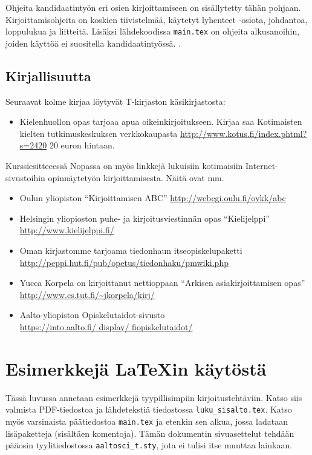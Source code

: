 Ohjeita kandidaatintyön eri osien kirjoittamiseen on sisällytetty
tähän pohjaan. Kirjoittamisohjeita on koskien tiivistelmää, käytetyt
lyhenteet -osiota, johdantoa, loppulukua ja liitteitä.  Lisäksi
lähdekoodissa \verb!main.tex! on ohjeita alkusanoihin, joiden käyttöä
ei suositella kandidaatintyössä.
.


\subsection{Kirjallisuutta}

Seuraavat kolme kirjaa löytyvät T-kirjaston käsikirjastosta:
%
\begin{itemize}


\item Kielenhuollon opas tarjoaa apua
  oikeinkirjoitukseen. Kirjaa saa Kotimaisten kielten
  tutkimuskeskuksen verkkokaupasta
  \url{http://www.kotus.fi/index.phtml?s=2420} 20 euron hintaan.
\end{itemize}

Kurssiesitteeessä Nopassa on myös linkkejä lukuisiin 
kotimaisiin Internet-sivustoihin opinnäytetyön kirjoittamisesta.
Näitä ovat mm.
%
\begin{itemize}
\item Oulun yliopiston ``Kirjoittamisen ABC''
  \url{http://webcgi.oulu.fi/oykk/abc}
%
\item Helsingin yliopioston puhe- ja kirjoitusviestinnän opas
  ``Kielijelppi'' \url{http://www.kielijelppi.fi/}
%
\item Oman kirjastomme tarjoama tiedonhaun itseopiskelupaketti
  \url{http://peppi.hut.fi/pub/opetus/tiedonhaku/pmwiki.php}
%
\item Yucca Korpela on kirjoittanut nettioppaan ``Arkisen
  asiakirjoittamisen opas'' \url{http://www.cs.tut.fi/~jkorpela/kirj/}
\item Aalto-yliopiston Opiskelutaidot-sivusto \\
  \url{https://into.aalto.fi/ display/ fiopiskelutaidot/}
%
\end{itemize}



\section{Esimerkkejä \LaTeX{}in käytöstä}
\label{sec:esimluku}

Tässä luvussa annetaan esimerkkejä tyypillisimpiin
kirjoitustehtäviin. Katso siis valmista PDF-tiedostoa ja lähdetekstiä
tiedostossa \verb!luku_sisalto.tex!. Katso myös varsinaista
päätiedostoa \verb!main.tex! ja etenkin sen alkua, jossa ladataan
lisäpaketteja (sisältäen komentoja). Tämän dokumentin sivuasettelut
tehdään pääosin tyylitiedostossa \verb!aaltosci_t.sty!, jota ei tulisi
itse muuttaa lainkaan.

